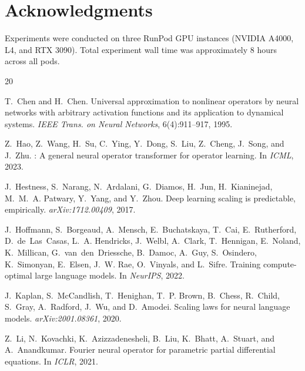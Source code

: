 \documentclass[11pt]{article}
\begin{document}
\section*{Acknowledgments}
Experiments were conducted on three RunPod GPU instances (NVIDIA A4000,
L4, and RTX 3090). Total experiment wall time was approximately 8 hours
across all pods.


\begin{thebibliography}{20}

T.~Chen and H.~Chen.
\newblock Universal approximation to nonlinear operators by neural networks
  with arbitrary activation functions and its application to dynamical systems.
\newblock \emph{IEEE Trans. on Neural Networks}, 6(4):911--917, 1995.

Z.~Hao, Z.~Wang, H.~Su, C.~Ying, Y.~Dong, S.~Liu, Z.~Cheng, J.~Song, and
  J.~Zhu.
: A general neural operator transformer for operator learning.
\newblock In \emph{ICML}, 2023.

J.~Hestness, S.~Narang, N.~Ardalani, G.~Diamos, H.~Jun, H.~Kianinejad,
  M.~M.~A. Patwary, Y.~Yang, and Y.~Zhou.
\newblock Deep learning scaling is predictable, empirically.
\newblock \emph{arXiv:1712.00409}, 2017.

J.~Hoffmann, S.~Borgeaud, A.~Mensch, E.~Buchatskaya, T.~Cai, E.~Rutherford,
  D.~de~Las~Casas, L.~A. Hendricks, J.~Welbl, A.~Clark, T.~Hennigan,
  E.~Noland, K.~Millican, G.~van~den~Driessche, B.~Damoc, A.~Guy,
  S.~Osindero, K.~Simonyan, E.~Elsen, J.~W. Rae, O.~Vinyals, and
  L.~Sifre.
\newblock Training compute-optimal large language models.
\newblock In \emph{NeurIPS}, 2022.

J.~Kaplan, S.~McCandlish, T.~Henighan, T.~P. Brown, B.~Chess, R.~Child,
  S.~Gray, A.~Radford, J.~Wu, and D.~Amodei.
\newblock Scaling laws for neural language models.
\newblock \emph{arXiv:2001.08361}, 2020.

Z.~Li, N.~Kovachki, K.~Azizzadenesheli, B.~Liu, K.~Bhatt, A.~Stuart, and
  A.~Anandkumar.
\newblock Fourier neural operator for parametric partial differential equations.
\newblock In \emph{ICLR}, 2021.


\end{thebibliography}
\end{document}

